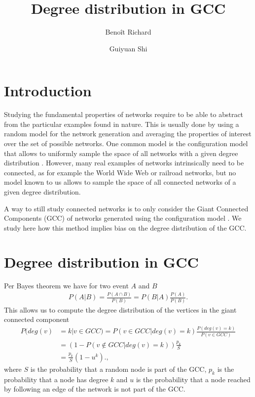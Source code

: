 \documentclass[a4paper]{article}
\title{Degree distribution in GCC}
\author{Benoît Richard \and Guiyuan Shi}
\begin{document}
\listoftodos

\maketitle


\section{Introduction}

Studying the fundamental properties of networks require to be able to abstract from the particular examples found in nature. This is usually done \missingref by using a random model for the network generation and averaging the properties of interest over the set of possible networks. One common model is the configuration model \missingref that allows to uniformly sample the space of all networks with a given degree distribution \missingref. However, many real examples of networks intrinsically need to be connected, as for example the World Wide Web or railroad networks, but no model known to us allows to sample the space of all connected networks of a given degree distribution.

A way to still study connected networks is to only consider the Giant Connected Components (GCC) of networks generated using the configuration model \missingref. We study here how this method implies bias on the degree distribution of the GCC.

\section{Degree distribution in GCC}

Per Bayes theorem we have for two event $A$ and $B$
\begin{align}
	P(A | B) = \frac{P(A \cap B)}{ P(B)} = P(B | A) \frac{P(A)}{P(B)}. \label{Bayes theorem}
\end{align}
This allows us to compute the degree distribution of the vertices in the giant connected component
\begin{align}
	P(deg(v) &= k | v \in GCC) = P(v \in GCC | deg(v) = k) \frac{P(deg(v) = k)}{P(v \in GCC)} \\
	&= (1 - P(v \notin GCC|deg(v) = k)) \frac{p_k}{S} \\
	&= \frac{p_k}{S} (1 - u^k). \label{Degree distribution in GCC},
\end{align}
where $S$ is the probability that a random node is part of the GCC, $p_k$ is the probability that a node has degree $k$ and $u$ is the probability that a node reached by following an edge of the network is not part of the GCC. 
\end{document}
